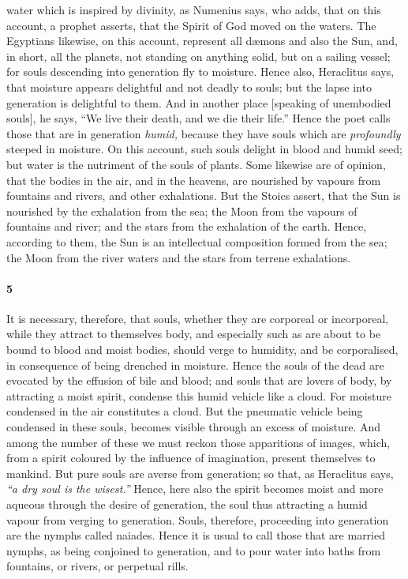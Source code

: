\documentclass[a4paper,12pt]{article}
\begin{document}
water which is inspired by divinity, as Numenius says, who adds, that on this
account, a prophet asserts, that the Spirit of God moved on the waters. The
Egyptians likewise, on this account, represent all d{\ae}mons and also the Sun,
and, in short, all the planets, not standing on anything solid, but on a
sailing vessel; for souls descending into generation fly to moisture. Hence
also, Heraclitus says, that moisture appears delightful and not deadly to
souls; but the lapse into generation is delightful to them. And in another
place [speaking of unembodied souls], he says, ``We live their death, and we
die their life.'' Hence the poet calls those that are in generation
\textit{humid,} because they have souls which are \textit{profoundly} steeped
in moisture. On this account, such souls delight in blood and humid seed; but
water is the nutriment of the souls of plants. Some likewise are of opinion,
that the bodies in the air, and in the heavens, are nourished by vapours from
fountains and rivers, and other exhalations. But the Stoics assert, that the
Sun is nourished by the exhalation from the sea; the Moon from the vapours of
fountains and river; and the stars from the exhalation of the earth. Hence,
according to them, the Sun is an intellectual composition formed from the sea;
the Moon from the river waters and the stars from terrene exhalations.


\paragraph{5} It is necessary, therefore, that souls, whether they are
corporeal or incorporeal, while they attract to themselves body, and especially
such as are about to be bound to blood and moist bodies, should verge to
humidity, and be corporalised, in consequence of being drenched in moisture.
Hence the souls of the dead are evocated by the effusion of bile and blood; and
souls that are lovers of body, by attracting a moist spirit, condense this
humid vehicle like a cloud. For moisture condensed in the air constitutes a
cloud. But the pneumatic vehicle being condensed in these souls, becomes
visible through an excess of moisture. And among the number of these we must
reckon those apparitions of images, which, from a spirit coloured by the
influence of imagination, present themselves to mankind. But pure souls are
averse from generation; so that, as Heraclitus says, \textit{``a dry soul is
the wisest.''} Hence, here also the spirit becomes moist and more aqueous
through the desire of generation, the soul thus attracting a humid vapour from
verging to generation. Souls, therefore, proceeding into generation are the
nymphs called naiades. Hence it is usual to call those that are married nymphs,
as being conjoined to generation, and to pour water into baths from fountains,
or rivers, or perpetual rills.
\end{document}
